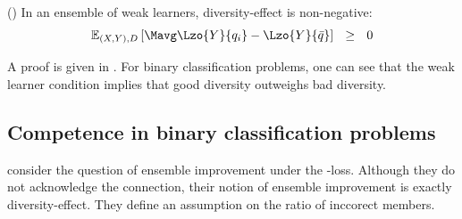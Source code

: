\documentclass[../main.tex]{subfiles}
\begin{document}
\begin{theorem} 
    \label{thm:weak-learner-ensembles-nonnegative}
    (\cite{wood_UnifiedTheoryDiversity_2023}) In an ensemble of weak learners, diversity-effect is non-negative:
$$
\mathbb{E}_{(X,Y),D}\left[ 
\Mavg \Lzo{Y}{q_{i}} - \Lzo{Y}{\bar{q}}
\right] 
~ ~ \geq ~ ~ 0
$$
\end{theorem}

A proof is given in \cite{wood_UnifiedTheoryDiversity_2023}. For binary classification problems, one can see that the weak learner condition implies that good diversity outweighs bad diversity.

\subsection{Competence in binary classification problems}

\citeauthor{theisen_WhenAreEnsembles_2023} consider the question of ensemble improvement under the \zeroone-loss. 
Although they do not acknowledge the connection, their notion of ensemble improvement is exactly diversity-effect.
They define an assumption on the ratio of inccorect members.
\end{document}

